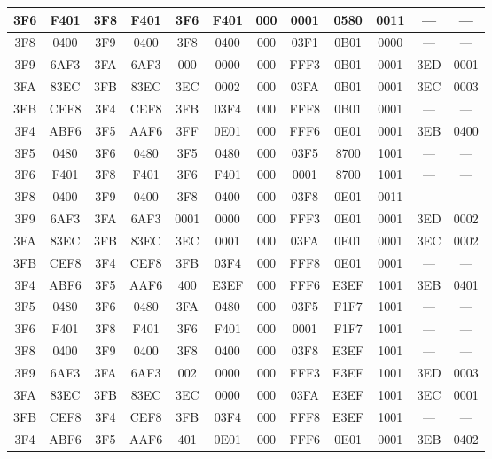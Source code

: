 \begin{flushleft}
\begin{tabular}{|c|c|c|c|c|c|c|c|c|c|c|c|}
\\
\hline
3F6 & F401 & 3F8 & F401 & 3F6 & F401 & 000 & 0001 & 0580 & 0011 & --- & ---
\\
\hline
3F8 & 0400 & 3F9 & 0400 & 3F8 & 0400 & 000 & 03F1 & 0B01 & 0000 & --- & ---
\\
\hline
3F9 & 6AF3 & 3FA & 6AF3 & 000 & 0000 & 000 & FFF3 & 0B01 & 0001 & 3ED & 0001
\\
\hline
3FA & 83EC & 3FB & 83EC & 3EC & 0002 & 000 & 03FA & 0B01 & 0001 & 3EC & 0003
\\
\hline
3FB & CEF8 & 3F4 & CEF8 & 3FB & 03F4 & 000 & FFF8 & 0B01 & 0001 & --- & ---
\\
\hline
\hline
3F4 & ABF6 & 3F5 & AAF6 & 3FF & 0E01 & 000 & FFF6 & 0E01 & 0001 & 3EB & 0400
\\
\hline
3F5 & 0480 & 3F6 & 0480 & 3F5 & 0480 & 000 & 03F5 & 8700 & 1001 & --- & ---
\\
\hline
3F6 & F401 & 3F8 & F401 & 3F6 & F401 & 000 & 0001 & 8700 & 1001 & --- & ---
\\
\hline
3F8 & 0400 & 3F9 & 0400 & 3F8 & 0400 & 000 & 03F8 & 0E01 & 0011 & --- & ---
\\
\hline
3F9 & 6AF3 & 3FA & 6AF3 & 0001 & 0000 & 000 & FFF3 & 0E01 & 0001 & 3ED & 0002
\\
\hline
3FA & 83EC & 3FB & 83EC & 3EC & 0001 & 000 & 03FA & 0E01 & 0001 & 3EC & 0002
\\
\hline
3FB & CEF8 & 3F4 & CEF8 & 3FB & 03F4 & 000 & FFF8 & 0E01 & 0001 & --- & ---
\\
\hline
\hline
3F4 & ABF6 & 3F5 & AAF6 & 400 & E3EF & 000 & FFF6 & E3EF & 1001 & 3EB & 0401
\\
\hline
3F5 & 0480 & 3F6 & 0480 & 3FA & 0480 & 000 & 03F5 & F1F7 & 1001 & --- & ---
\\
\hline
3F6 & F401 & 3F8 & F401 & 3F6 & F401 & 000 & 0001 & F1F7 & 1001 & --- & ---
\\
\hline
3F8 & 0400 & 3F9 & 0400 & 3F8 & 0400 & 000 & 03F8 & E3EF & 1001 & --- & ---
\\
\hline
3F9 & 6AF3 & 3FA & 6AF3 & 002 & 0000 & 000 & FFF3 & E3EF & 1001 & 3ED & 0003
\\
\hline
3FA & 83EC & 3FB & 83EC & 3EC & 0000 & 000 & 03FA & E3EF & 1001 & 3EC & 0001
\\
\hline
3FB & CEF8 & 3F4 & CEF8 & 3FB & 03F4 & 000 & FFF8 & E3EF & 1001 & --- & ---
\\
\hline
\hline
3F4 & ABF6 & 3F5 & AAF6 & 401 & 0E01 & 000 & FFF6 & 0E01 & 0001 & 3EB & 0402
\\
\hline

\end{tabular}
\end{flushleft}
